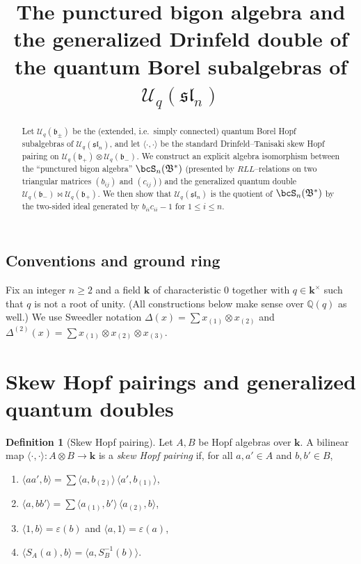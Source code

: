 \documentclass[11pt]{article}
\theoremstyle{definition}
\newtheorem{definition}{Definition}
\newcommand{\Bbbk}{\mathbf{k}}
\newcommand{\Uc}{\mathcal{U}}
\newcommand{\fsl}{\mathfrak{sl}}
\newcommand{\fb}{\mathfrak{b}}
\newcommand{\eps}{\varepsilon}
\newcommand{\bipr}{\bowtie}
\newcommand{\tensor}{\otimes}
\newcommand{\la}{\langle}
\newcommand{\ra}{\rangle}
\begin{document}
\title{The punctured bigon algebra and the generalized Drinfeld double of the quantum Borel subalgebras of $\Uc_q(\fsl_n)$}
\author{}
\date{}
\maketitle

\begin{abstract}
Let $\Uc_q(\fb_\pm)$ be the (extended, i.e.\ simply connected) quantum Borel Hopf subalgebras of $\Uc_q(\fsl_n)$, and let $\la\cdot,\cdot\ra$ be the standard Drinfeld--Tanisaki skew Hopf pairing on $\Uc_q(\fb_+)\tensor \Uc_q(\fb_-)$. We construct an explicit algebra isomorphism between the ``punctured bigon algebra'' $\bcS_n(\mathfrak B^*)$ (presented by $RLL$--relations on two triangular matrices $(b_{ij})$ and $(c_{ij})$) and the generalized quantum double $\Uc_q(\fb_-)\bipr \Uc_q(\fb_+)$. We then show that $\Uc_q(\fsl_n)$ is the quotient of $\bcS_n(\mathfrak B^*)$ by the two-sided ideal generated by $b_{ii}c_{ii}-1$ for $1\le i\le n$.
\end{abstract}

\subsection*{Conventions and ground ring}
Fix an integer $n\ge 2$ and a field $\Bbbk$ of characteristic $0$ together with $q\in \Bbbk^\times$ such that $q$ is not a root of unity. (All constructions below make sense over $\mathbb{Q}(q)$ as well.) We use Sweedler notation $\Delta(x)=\sum x_{(1)}\tensor x_{(2)}$ and $\Delta^{(2)}(x)=\sum x_{(1)}\tensor x_{(2)}\tensor x_{(3)}$.


\section{Skew Hopf pairings and generalized quantum doubles}

\begin{definition}[Skew Hopf pairing]
Let $A,B$ be Hopf algebras over $\Bbbk$. A bilinear map $\la\cdot,\cdot\ra:A\tensor B\to \Bbbk$ is a \emph{skew Hopf pairing} if, for all $a,a'\in A$ and $b,b'\in B$,
\begin{enumerate}[label=(\roman*)]
\item $\la aa',b\ra=\sum \la a,b_{(2)}\ra\,\la a',b_{(1)}\ra$,
\item $\la a,bb'\ra=\sum \la a_{(1)},b'\ra\,\la a_{(2)},b\ra$,
\item $\la 1,b\ra=\eps(b)$ and $\la a,1\ra=\eps(a)$,
\item $\la S_A(a),b\ra=\la a,S_B^{-1}(b)\ra$.
\end{enumerate}
\end{definition}
\end{document}
